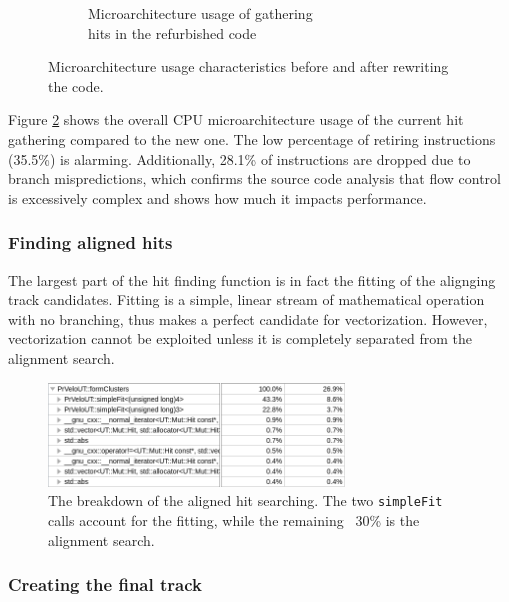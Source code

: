 \documentclass[12pt]{article}
\newcommand{\code}[1]{\texttt{#1}}
\begin{document}
\begin{figure}[H]
\begin{subfigure}{.5\textwidth}
		\caption{Microarchitecture usage of gathering\\ hits in the refurbished code}
		\label{fig_velout_branch_example_sub2}
	\end{subfigure}
	\caption{Microarchitecture usage characteristics before and after rewriting the code.}
	\label{fig_velout_branch_example}
\end{figure}

Figure \ref{fig_velout_branch_example} shows the overall CPU microarchitecture usage of the current hit gathering compared to the new one. The low percentage of retiring instructions (35.5\%) is alarming. Additionally, 28.1\% of instructions are dropped due to branch mispredictions, which confirms the source code analysis that flow control is excessively complex and shows how much it impacts performance.


\subsubsection{Finding aligned hits}

The largest part of the hit finding function is in fact the fitting of the alignging track candidates. Fitting is a simple, linear stream of mathematical operation with no branching, thus makes a perfect candidate for vectorization. However, vectorization cannot be exploited unless it is completely separated from the alignment search.

\begin{figure}[H]
	\begin{center}
		\includegraphics[width=0.7\textwidth]{velout_hotspots_orig_formclusters}
	\end{center}
	\caption{The breakdown of the aligned hit searching. The two \code{simpleFit} calls account for the fitting, while the remaining ~30\% is the alignment search.}
	\label{fig_velout_hotspots_orig_formclusters}
\end{figure}


\subsubsection{Creating the final track}
\end{document}
